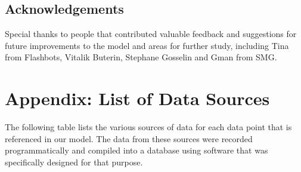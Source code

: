 \documentclass[conference]{IEEEtran}
\begin{document}
\subsection{Acknowledgements}

Special thanks to people that contributed valuable feedback and suggestions for future improvements to the model and areas for further study, including Tina from Flashbots, Vitalik Buterin, Stephane Gosselin and Gman from SMG.


\newpage

\printbibliography

\newpage

\onecolumn

\section{Appendix: List of Data Sources}

\vspace{12pt}

The following table lists the various sources of data for each data point that is referenced in our model.  The data from these sources were recorded programmatically and compiled into a database using software that was specifically designed for that purpose.

\vspace{24pt}
\end{document}
